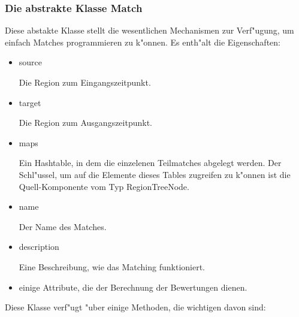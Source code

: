 \subsubsection{Die abstrakte Klasse Match}
Diese abstakte Klasse stellt die wesentlichen Mechanismen zur Verf"ugung, um einfach Matches programmieren zu k"onnen. Es enth"alt die Eigenschaften:
\begin{itemize}
\item source

Die Region zum Eingangszeitpunkt.

\item target

Die Region zum Ausgangszeitpunkt.

\item maps

Ein Hashtable, in dem die einzelenen Teilmatches abgelegt werden. Der Schl"ussel, um auf die Elemente dieses Tables zugreifen zu k"onnen ist die Quell-Komponente vom Typ RegionTreeNode.

\item name

Der Name des Matches.

\item description

Eine Beschreibung, wie das Matching funktioniert.

\item einige Attribute, die der Berechnung der Bewertungen dienen.
\end{itemize} 

Diese Klasse verf"ugt "uber einige Methoden, die wichtigen davon  sind:


